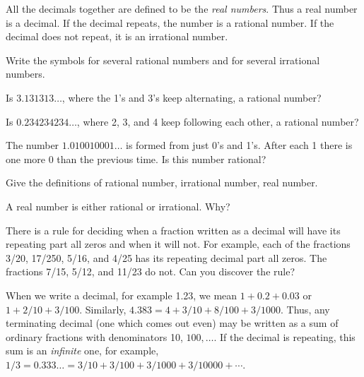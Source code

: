 \documentclass[11pt]{book}
\theoremstyle{bkplain}
\theoremstyle{XIplainnote}
\theoremstyle{bkplain}
\theoremstyle{bkplain}
\begin{document}
All the decimals together are defined to be the \emph{real numbers}. Thus a
real number is a decimal. If the decimal repeats, the number is a rational
number. If the decimal does not repeat, it is an irrational number.


\begin{exercisecols}
\begin{exlist}
\item Write the symbols for several rational numbers and for several irrational
      numbers.
\item Is $3.131313\ldots$, where the 1's and 3's keep alternating, a rational
      number?
\item Is $0.234234234\ldots$, where 2, 3, and 4 keep following each other, a
      rational number?
\item[\stex 4.] The number $1.010010001\ldots$ is formed from just 0's and 1's.
      After each 1 there is one more 0 than the previous time. Is this number
      rational?
\item[5.] Give the definitions of rational number, irrational number, real
      number.
\item[6.] A real number is either rational or irrational. Why?
\item[\stex 7.] There is a rule for deciding when a fraction written as a
      decimal will have its repeating part all zeros and when it will not. For
      example, each of the fractions 3/20, 17/250, 5/16, and 4/25 has its
      repeating decimal part all zeros. The fractions 7/15, 5/12, and 11/23 do
      not. Can you discover the rule?
\end{exlist}
\end{exercisecols}

When we write a decimal, for example 1.23, we mean $1 + 0.2 + 0.03$ or
$1 + 2/10 + 3/100$. Similarly, $4.383 = 4 + 3/10 + 8/100 + 3/1000$. Thus, any
terminating decimal (one which comes out even) may be written as a sum of
ordinary fractions with denominators 10, $100,\ldots$. If the decimal is
repeating, this sum is an \emph{infinite} one, for example,
$1/3 = 0.333\ldots = 3/10 + 3/100 + 3/1000 + 3/10000 + \cdots$.

\end{document}
